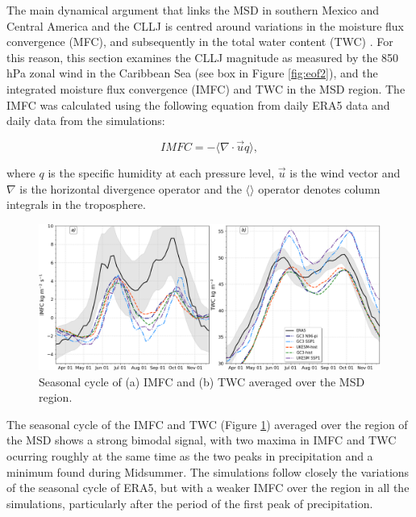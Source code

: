 The main dynamical argument that links the MSD in southern Mexico and Central America and the CLLJ is centred around variations in the moisture flux convergence (MFC), and subsequently in the total water content (TWC) \citep[see e.g.][]{gamble2008,herrera2015,martinez2019,zermeno2019}. For this reason, this section examines the CLLJ magnitude as measured by the 850 hPa zonal wind in the Caribbean Sea (see box in Figure \ref{fig:eof2}), and the integrated moisture flux convergence (IMFC) and TWC in the MSD region.
The IMFC was calculated using the following equation from daily ERA5 data and daily data from the simulations:

\begin{equation}
IMFC=-\Bigg\langle \nabla \cdot \vec{u}q \Bigg \rangle,
\label{eq:waterbudget}
\end{equation}

\noindent where $q$ is the specific humidity at each pressure level, $\vec{u}$ is the wind vector and $\nabla$ is the horizontal divergence operator and the $\langle \rangle$ operator denotes column integrals in the troposphere.

 \begin{figure}[t!]
\includegraphics[width=\linewidth]{figures/imfd_index_seasonal}
\caption[Seasonal cycle of IMFC and TWC]{Seasonal cycle of (a) IMFC and (b) TWC averaged over the MSD region.}
\label{fig:imfd_cycle}
\end{figure}

The seasonal cycle of the IMFC and TWC (Figure \ref{fig:imfd_cycle}) averaged over the region of the MSD shows a strong bimodal signal, with two maxima in IMFC and TWC ocurring roughly at the same time as the two peaks in precipitation and a minimum found during Midsummer. The simulations follow closely the variations of the seasonal cycle of ERA5, but with a weaker IMFC over the region in all the simulations, particularly after the period of the first peak of precipitation. 

